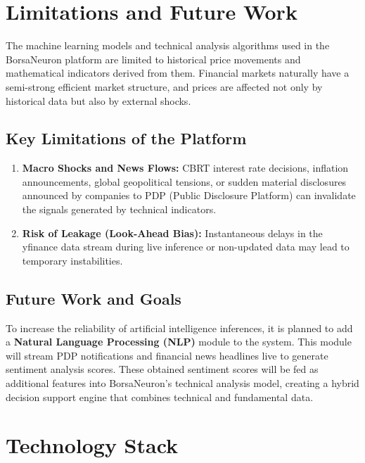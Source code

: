 \documentclass[12pt,a4paper]{report}
\begin{document}
\chapter{Limitations and Future Work}

The machine learning models and technical analysis algorithms used in the BorsaNeuron platform are limited to historical price movements and mathematical indicators derived from them. Financial markets naturally have a semi-strong efficient market structure, and prices are affected not only by historical data but also by external shocks.

\section{Key Limitations of the Platform}
\begin{enumerate}
    \item \textbf{Macro Shocks and News Flows:} CBRT interest rate decisions, inflation announcements, global geopolitical tensions, or sudden material disclosures announced by companies to PDP (Public Disclosure Platform) can invalidate the signals generated by technical indicators.
    \item \textbf{Risk of Leakage (Look-Ahead Bias):} Instantaneous delays in the yfinance data stream during live inference or non-updated data may lead to temporary instabilities.
\end{enumerate}

\section{Future Work and Goals}
To increase the reliability of artificial intelligence inferences, it is planned to add a \textbf{Natural Language Processing (NLP)} module to the system. This module will stream PDP notifications and financial news headlines live to generate sentiment analysis scores. These obtained sentiment scores will be fed as additional features into BorsaNeuron's technical analysis model, creating a hybrid decision support engine that combines technical and fundamental data.

\chapter{Technology Stack}
\end{document}
